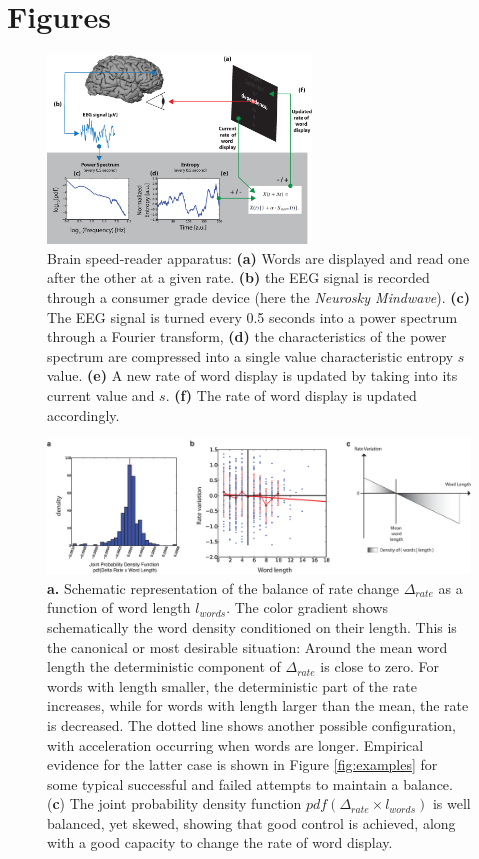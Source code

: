 \section{Figures}

\begin{figure}[H]
\centering
\includegraphics[width=7cm]{../figures2/apparatus.eps}
\caption{Brain speed-reader apparatus: {\bf (a)} Words are displayed and read one after the other at a given rate. {\bf (b)} the EEG signal is recorded through a consumer grade device (here the {\it Neurosky Mindwave}). {\bf (c)} The EEG signal is turned every 0.5 seconds into a power spectrum through a Fourier transform, {\bf (d)} the characteristics of the power spectrum are compressed into a single value characteristic entropy $s$ value. {\bf (e)} A new rate of word display is updated by taking into its current value and $s$. {\bf (f)} The rate of word display is updated accordingly.}
\label{fig:apparatus}
\end{figure}

\begin{figure}[H]
\centering
\includegraphics[width=17cm]{../figures2/balance.eps}
\caption{{\bf a.} Schematic representation of the balance of rate change $\Delta_{rate}$ as a function of word length $l_{words}$. The color gradient shows schematically the word density conditioned on their length. This is the canonical or most desirable situation: Around the mean word length the deterministic component of $\Delta_{rate}$ is close to zero. For words with length smaller, the deterministic part of the rate increases, while for words with length larger than the mean, the rate is decreased. The dotted line shows another possible configuration, with acceleration occurring when words are longer. Empirical evidence for the latter case is shown  in Figure \ref{fig:examples} for some typical successful and failed attempts to maintain a balance. ({\bf c}) The joint probability density function $pdf( \Delta_{rate} \times l_{words})$ is well balanced, yet skewed, showing that good control is achieved, along with a good capacity to change the rate of word display.}
\label{fig:apparatus}
\end{figure}

